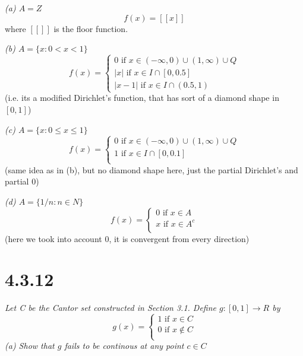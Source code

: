 \documentclass[11pt,oneside,titlepage]{book}
\begin{document}
\textit{(a) $A = Z$}
$$f(x) = [[x]]$$
where $[[]]$ is the floor function.

\textit{(b) $A = \{x: 0 < x < 1\}$}
\begin{equation}
  f(x) =
  \begin{cases}
    0 \text{ if } x \in (-\infty, 0) \cup (1, \infty) \cup Q \\
    |x| \text{ if } x \in I \cap [0, 0.5] \\
    |x - 1| \text{ if } x \in I \cap (0.5, 1)
  \end{cases}
\end{equation}
(i.e. its a modified Dirichlet's function, that has sort of a diamond shape
in $[0, 1]$)

\textit{(c) $A = \{x: 0 \leq x \leq 1\}$}
\begin{equation}
  f(x) =
  \begin{cases}
    0 \text{ if } x \in (-\infty, 0) \cup (1, \infty) \cup Q \\
    1 \text{ if } x \in I \cap [0, 0.1] \\
  \end{cases}
\end{equation}
(same idea as in (b), but no diamond shape here, just the partial Dirichlet's
and partial 0)

\textit{(d) $A = \{1/n: n \in N\}$}
\begin{equation}
  f(x) =
  \begin{cases}
    0 \text{ if } x \in A \\
    x \text{ if } x \in A^c \\
  \end{cases}
\end{equation}
(here we took into account 0, it is convergent from every direction)

\section*{4.3.12}
\textit{Let C be the Cantor set constructed in Section 3.1. Define
$g: [0, 1] \to R$ by}
\begin{equation}
  g(x) =
  \begin{cases}
    1 \text{ if } x \in C \\
    0 \text{ if } x \not \in C \\
  \end{cases}
\end{equation}
\textit{(a) Show that $g$ fails to be continous at any point $c \in C$}
\end{document}
